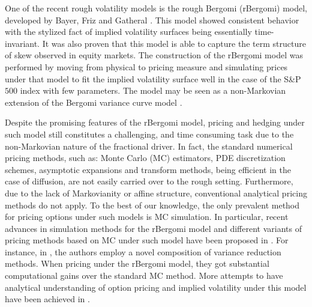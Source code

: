  One of the recent rough volatility models is the rough Bergomi (rBergomi) model, developed by Bayer, Friz and Gatheral \cite{bayer2016pricing}. This model showed   consistent behavior with the stylized fact of implied volatility surfaces being essentially time-invariant. It was also proven that this model 
 is able to capture the term structure of skew observed in equity markets. The construction of the rBergomi model was performed by  moving from  physical to pricing measure and simulating prices under that model to fit  the implied volatility surface well in the case of the S\&P $500$ index with few parameters. The model may be seen as a non-Markovian extension of the Bergomi variance curve model \cite{bergomi2005smile}.
 
Despite the promising features of the rBergomi model, pricing  and hedging under such model still constitutes a challenging, and time consuming task due  to the non-Markovian nature of the fractional driver. In fact, the standard numerical pricing methods, such as: Monte Carlo (MC) estimators, PDE discretization schemes, asymptotic expansions and transform
methods, being efficient in the case of diffusion, are not easily  carried over to the rough setting. Furthermore,  due to the lack of Markovianity or affine structure, conventional analytical pricing methods  do not apply. To the best of our knowledge, the only prevalent method for pricing  options under such models is MC simulation. In particular,  recent advances in simulation methods for the rBergomi model and different variants of pricing methods based on  MC under such model   have been proposed in \cite{bayer2016pricing,bayer2017regularity,mccrickerd2017turbocharging,bennedsen2017hybrid,jacquier2018vix}.  For instance, in \cite{mccrickerd2017turbocharging}, the authors employ a novel composition of variance reduction methods. When pricing under the rBergomi model, they got  substantial computational gains  over the standard MC method. More attempts to have  analytical understanding of option pricing and implied volatility under this model have been achieved  in \cite{jacquier2017pathwise,bayer2017short,forde2017asymptotics}. 


